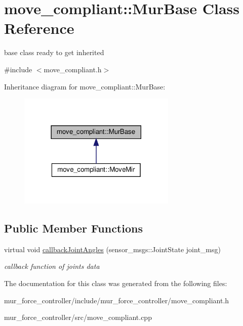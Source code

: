 \hypertarget{classmove__compliant_1_1MurBase}{}\section{move\+\_\+compliant\+:\+:Mur\+Base Class Reference}
\label{classmove__compliant_1_1MurBase}


base class ready to get inherited  




{\ttfamily \#include $<$move\+\_\+compliant.\+h$>$}



Inheritance diagram for move\+\_\+compliant\+:\+:Mur\+Base\+:
\nopagebreak
\begin{figure}[H]
\begin{center}
\leavevmode
\includegraphics[width=213pt]{d4/d55/classmove__compliant_1_1MurBase__inherit__graph}
\end{center}
\end{figure}
\subsection*{Public Member Functions}
\begin{DoxyCompactItemize}
\item 
\mbox{\label{classmove__compliant_1_1MurBase_a3ca7696f5ee13563dabe58e6502f9dbf}} 
virtual void \hyperlink{classmove__compliant_1_1MurBase_a3ca7696f5ee13563dabe58e6502f9dbf}{callback\+Joint\+Angles} (sensor\+\_\+msgs\+::\+Joint\+State joint\+\_\+msg)
\begin{DoxyCompactList}\small\item\em callback function of joints data \end{DoxyCompactList}\end{DoxyCompactItemize}


The documentation for this class was generated from the following files\+:\begin{DoxyCompactItemize}
\item 
mur\+\_\+force\+\_\+controller/include/mur\+\_\+force\+\_\+controller/move\+\_\+compliant.\+h\item 
mur\+\_\+force\+\_\+controller/src/move\+\_\+compliant.\+cpp\end{DoxyCompactItemize}
